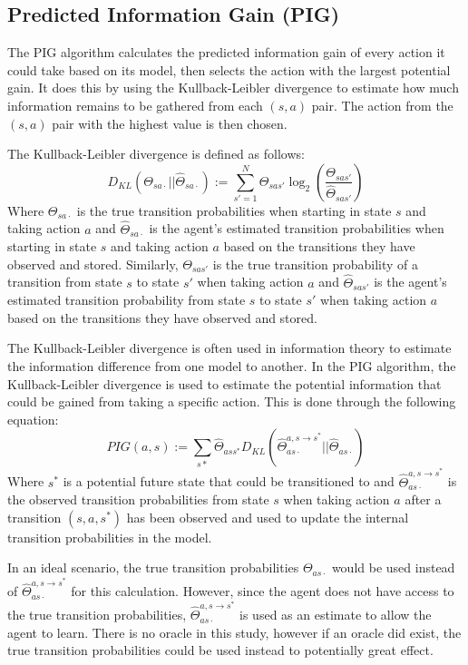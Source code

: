 \documentclass[12pt]{thesis}
\begin{document}
\subsection{Predicted Information Gain (PIG)}
The PIG algorithm calculates the predicted information gain of every action it could take based on its model, then selects the action with the largest potential gain. It does this by using the Kullback-Leibler divergence to estimate how much information remains to be gathered from each $(s,a)$ pair. The action from the $(s,a)$ pair with the highest value is then chosen.

The Kullback-Leibler divergence is defined as follows:
\[D_{KL} (\Theta_{sa\cdot} || \hat{\Theta}_{sa\cdot}) := \sum_{s' = 1}^{ N} \Theta_{sas'} \log_{2}(\frac{\Theta_{sas'}}{\hat{\Theta}_{sas'}})   \]
Where $\Theta_{sa\cdot}$ is the true transition probabilities when starting in state $s$ and taking action $a$ and $\hat{\Theta}_{sa\cdot}$ is the agent's estimated transition probabilities when starting in state $s$ and taking action $a$  based on the transitions they have observed and stored. Similarly, $\Theta_{sas'}$ is the true transition probability of a transition from state $s$ to state $s'$ when taking action $a$ and $\hat{\Theta}_{sas'}$ is the agent's estimated transition probability from state $s$ to state $s'$ when taking action $a$ based on the transitions they have observed and stored.

The Kullback-Leibler divergence is often used in information theory to estimate the information difference from one model to another. In the PIG algorithm, the Kullback-Leibler divergence is used to estimate the potential information that could be gained from taking a specific action.
This is done through the following equation:
\[ PIG(a,s) := \sum_{s*} \hat{\Theta}_{ass^{*}}D_{KL}(\hat{\Theta}_{as\cdot}^{a,s \rightarrow s^{*}} || \hat{\Theta}_{as\cdot}) \]
Where $s^{*}$ is a potential future state that could be transitioned to and $\hat{\Theta}_{as\cdot}^{a,s \rightarrow s^{*}}$ is the observed transition probabilities from state $s$ when taking action $a$ after a transition $(s,a,s^{*})$ has been observed and used to update the internal transition probabilities in the model.

In an ideal scenario, the true transition probabilities $\Theta_{as\cdot}$ would be used instead of $\hat{\Theta}_{as\cdot}^{a,s \rightarrow s^{*}}$ for this calculation. However, since the agent does not have access to the true transition probabilities, $\hat{\Theta}_{as\cdot}^{a,s \rightarrow s^{*}}$ is used as an estimate to allow the agent to learn. There is no oracle in this study, however if an oracle did exist, the true transition probabilities could be used instead to potentially great effect.
\end{document}
